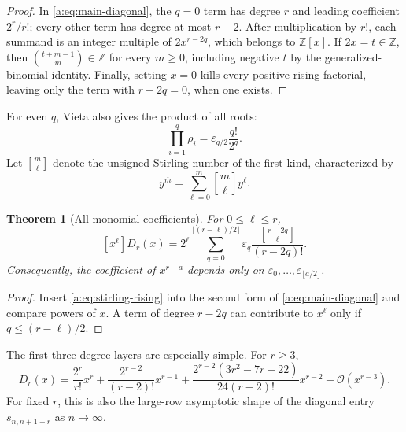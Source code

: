 \documentclass[11pt,a4paper,oneside,openany]{book}
\numberwithin{equation}{chapter}
\newtheorem{theorem}{Theorem}[chapter]
\theoremstyle{definition}
\theoremstyle{remark}
\newcommand{\Z}{\mathbb Z}
\newcommand{\eps}{\varepsilon}
\newcommand{\rising}[2]{#1^{\overline{#2}}}
\newcommand{\bigO}{\mathcal O}
\newcommand{\Diag}{D}
\newcommand{\stirlingfirst}[2]{\genfrac{[}{]}{0pt}{}{#1}{#2}}
\begin{document}
\begin{proof}
In \eqref{a:eq:main-diagonal}, the \(q=0\) term has degree \(r\) and leading
coefficient \(2^r/r!\); every other term has degree at most \(r-2\).  After
multiplication by \(r!\), each summand is an integer multiple of
\(\rising{2x}{r-2q}\), which belongs to \(\Z[x]\).  If \(2x=t\in\Z\), then
\(\binom{t+m-1}{m}\in\Z\) for every \(m\ge0\), including negative \(t\) by
the generalized-binomial identity.  Finally, setting \(x=0\) kills every
positive rising factorial, leaving only the term with \(r-2q=0\), when one
exists.
\end{proof}
For even \(q\), Vieta also gives the product of all roots:
\begin{equation}
 \prod_{i=1}^{q}\rho_i
 =\eps_{q/2}\frac{q!}{2^q}.                                \label{c:eq:root-product-even}
\end{equation}
Let \(\stirlingfirst{m}{\ell}\) denote the unsigned Stirling number of
the first kind, characterized by
\begin{equation}
 \rising{y}{m}=\sum_{\ell=0}^{m}
 \stirlingfirst{m}{\ell}y^\ell.
 \label{a:eq:stirling-rising}
\end{equation}

\begin{theorem}[All monomial coefficients]
For \(0\le\ell\le r\),
\begin{equation}
 \boxed{
 [x^\ell]\Diag_r(x)=
 2^\ell
 \sum_{q=0}^{\lfloor(r-\ell)/2\rfloor}
 \eps_q\frac{\stirlingfirst{r-2q}{\ell}}{(r-2q)!}.}
 \label{a:eq:all-monomial-coefficients}
\end{equation}
Consequently, the coefficient of \(x^{r-a}\) depends only on
\(\eps_0,\ldots,\eps_{\lfloor a/2\rfloor}\).
\end{theorem}

\begin{proof}
Insert \eqref{a:eq:stirling-rising} into the second form of
\eqref{a:eq:main-diagonal} and compare powers of \(x\).  A term of degree
\(r-2q\) can contribute to \(x^\ell\) only if \(q\le(r-\ell)/2\).
\end{proof}

The first three degree layers are especially simple.  For \(r\ge3\),
\begin{equation}
 \boxed{
 \Diag_r(x)=
 \frac{2^r}{r!}x^r
 +\frac{2^{r-2}}{(r-2)!}x^{r-1}
 +\frac{2^{r-2}(3r^2-7r-22)}{24(r-2)!}x^{r-2}
 +\bigO(x^{r-3}).}
 \label{a:eq:top-three-layers}
\end{equation}
For fixed \(r\), this is also the large-row asymptotic shape of the diagonal
entry \(s_{n,n+1+r}\) as \(n\to\infty\).
\end{document}
